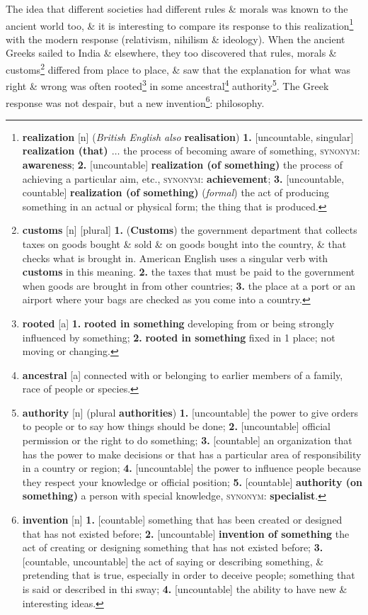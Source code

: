 \documentclass[oneside]{book}
\numberwithin{equation}{section}
\begin{document}
The idea that different societies had different rules \& morals was known to the ancient world too, \& it is interesting to compare its response to this realization\footnote{\textbf{realization} [n] (\textit{British English also} \textbf{realisation}) \textbf{1.} [uncountable, singular] \textbf{realization (that) $\ldots$} the process of becoming aware of something, \textsc{synonym}: \textbf{awareness}; \textbf{2.} [uncountable] \textbf{realization (of something)} the process of achieving a particular aim, etc., \textsc{synonym}: \textbf{achievement}; \textbf{3.} [uncountable, countable] \textbf{realization (of something)} (\textit{formal}) the act of producing something in an actual or physical form; the thing that is produced.} with the modern response (relativism, nihilism \& ideology). When the ancient Greeks sailed to India \& elsewhere, they too discovered that rules, morals \& customs\footnote{\textbf{customs} [n] [plural] \textbf{1.} (\textbf{Customs}) the government department that collects taxes on goods bought \& sold \& on goods bought into the country, \& that checks what is brought in. American English uses a singular verb with \textbf{customs} in this meaning. \textbf{2.} the taxes that must be paid to the government when goods are brought in from other countries; \textbf{3.} the place at a port or an airport where your bags are checked as you come into a country.} differed from place to place, \& saw that the explanation for what was right \& wrong was often rooted\footnote{\textbf{rooted} [a] \textbf{1.} \textbf{rooted in something} developing from or being strongly influenced by something; \textbf{2.} \textbf{rooted in something} fixed in 1 place; not moving or changing.} in some ancestral\footnote{\textbf{ancestral} [a] connected with or belonging to earlier members of a family, race of people or species.} authority\footnote{\textbf{authority} [n] (plural \textbf{authorities}) \textbf{1.} [uncountable] the power to give orders to people or to say how things should be done; \textbf{2.} [uncountable] official permission or the right to do something; \textbf{3.} [countable] an organization that has the power to make decisions or that has a particular area of responsibility in a country or region; \textbf{4.} [uncountable] the power to influence people because they respect your knowledge or official position; \textbf{5.} [countable] \textbf{authority (on something)} a person with special knowledge, \textsc{synonym}: \textbf{specialist}.}. The Greek response was not despair, but a new invention\footnote{\textbf{invention} [n] \textbf{1.} [countable] something that has been created or designed that has not existed before; \textbf{2.} [uncountable] \textbf{invention of something} the act of creating or designing something that has not existed before; \textbf{3.} [countable, uncountable] the act of saying or describing something, \& pretending that is true, especially in order to deceive people; something that is said or described in thi sway; \textbf{4.} [uncountable] the ability to have new \& interesting ideas.}: philosophy.
\end{document}
